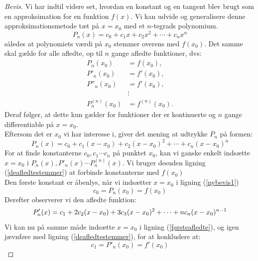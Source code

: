 \documentclass[12pt, a4paper]{article}
\begin{document}
\begin{refsection}
\begin{proof}[Bevis]
Vi har indtil videre set, hvordan en konstant og en tangent blev brugt som en approksimation for en funktion $f(x)$. Vi kan udvide og generalisere denne approksimationsmetode tæt på $x=x_0$ med et  $n$-tegrads polynomium.\\
\[
P_n(x)=c_0+c_1x+c_2x^2+ \cdots +c_nx^n
\] 
således at polynomiets værdi på $x_0$ stemmer overens med  $f(x_0)$. Det samme skal gælde for alle afledte, op til $n$ gange afledte funktioner, dvs:
 \begin{equation}\label{deafledtestemmer}
     \begin{aligned}
         P_n(x_0)&=f(x_0),\\
         P'_n(x_0)&=f'(x_0),\\
         P''_n(x_0)&=f'(x_0),\\
                   &\vdots\\
         P^{(n)}_n(x_0)&=f^{(n)}(x_0).
     \end{aligned}
\end{equation}
Deraf følger, at dette kun gælder for funktioner der er kontinuerte og $n$ gange differentiable på $x=x_0$.\\
Eftersom det er $x_0$ vi har interesse i, giver det mening at udtrykke  $P_n$ på formen:
\begin{equation}\label{nybevis1}
   P_n(x)=c_0+c_1(x-x_0)+c_2(x-x_0)^2+\cdots+c_n(x-x_0)^n 
\end{equation}
For at finde konstanterne $c_0, c_1 \cdots c_n$ på punktet $x_0$, kan vi ganske enkelt indsætte $x=x_0$ i $P_n(x), P'_n(x) \cdots P^{(n)}_n(x)$. Vi bruger desuden ligning (\ref{deafledtestemmer}) at forbinde konstanterne med $f(x_0)$\\
Den første konstant er åbenlys, når vi indsætter $x=x_0$ i ligning (\ref{nybevis1})
 \begin{equation*}
    c_0=P_n(x_0)=f(x_0)
\end{equation*}
Derefter observerer vi den afledte funktion: 
\begin{equation}\label{førsteafledte}
        P'_n(x)=c_1+2c_2(x-x_0)+3c_3(x-x_0)^2+\cdots+nc_n(x-x_0)^{n-1}\\
\end{equation}
Vi kan nu på samme måde indsætte $x=x_0$ i ligning (\ref{førsteafledte}), og igen jævnføre med ligning (\ref{deafledtestemmer}), for at konkludere at:
\begin{equation*}
    c_1=P'_n(x_0)=f'(x_0)
\end{equation*}

\end{proof}
\end{refsection}
\end{document}
